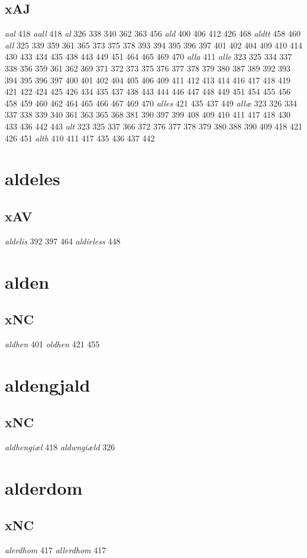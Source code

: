 \documentclass[a4paper,twocolumn]{article}
\begin{document}
\subsection{xAJ}
\label{sec:org19c06de}
\emph{aal} 418 \emph{aall} 418 \emph{al} 326 338 340 362 363 456 \emph{ald} 400 406 412 426 468 \emph{aldtt} 458 460 \emph{all} 325 339 359 361 365 373 375 378 393 394 395 396 397 401 402 404 409 410 414 430 433 434 435 438 443 449 451 464 465 469 470 \emph{alla} 411 \emph{alle} 323 325 334 337 338 356 359 361 362 369 371 372 373 375 376 377 378 379 380 387 389 392 393 394 395 396 397 400 401 402 404 405 406 409 411 412 413 414 416 417 418 419 421 422 424 425 426 434 435 437 438 443 444 446 447 448 449 451 454 455 456 458 459 460 462 464 465 466 467 469 470 \emph{alles} 421 435 437 449 \emph{allæ} 323 326 334 337 338 339 340 361 363 365 368 381 390 397 399 408 409 410 411 417 418 430 433 436 442 443 \emph{alt} 323 325 337 366 372 376 377 378 379 380 388 390 409 418 421 426 451 \emph{alth} 410 411 417 435 436 437 442 
\section{aldeles}
\label{sec:org4933f7d}
\subsection{xAV}
\label{sec:org2e8b503}
\emph{aldelis} 392 397 464 \emph{aldieless} 448 
\section{alden}
\label{sec:org5084685}
\subsection{xNC}
\label{sec:org5898dbb}
\emph{aldhen} 401 \emph{oldhen} 421 455 
\section{aldengjald}
\label{sec:org3301fb7}
\subsection{xNC}
\label{sec:org05f4352}
\emph{aldhengiæl} 418 \emph{aldwngiæld} 326 
\section{alderdom}
\label{sec:org77ee3b2}
\subsection{xNC}
\label{sec:org7d3354a}
\emph{alerdhom} 417 \emph{allerdhom} 417 
\end{document}
